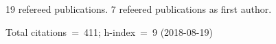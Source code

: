 19 refereed publications. 7 refeered publications as first author.

               Total citations~=~411; h-index~=~9 (2018-08-19)